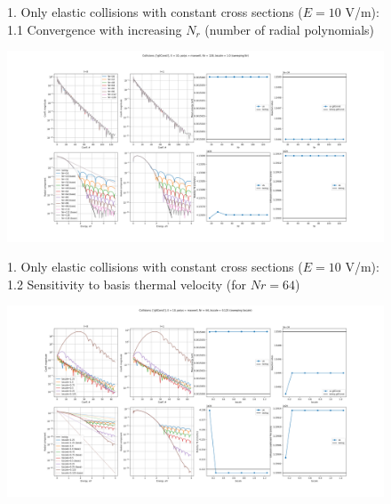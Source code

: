 \documentclass[mathserif, aspectratio=169]{beamer}
\begin{document}
\begin{frame}

\begin{figure}
1. Only elastic collisions with constant cross sections ($E=10$ V/m):
\\ 
1.1 Convergence with increasing $N_r$ (number of radial polynomials)

\includegraphics[width=\textwidth]{maxwell_vs_bolsig_g0Const_E10_poly_maxwell_nrsweep_bscale1.png}
\end{figure}

\end{frame}



\begin{frame}

\begin{figure}
1. Only elastic collisions with constant cross sections ($E=10$ V/m):
\\ 
1.2 Sensitivity to basis thermal velocity (for $Nr = 64$)

\includegraphics[width=\textwidth]{maxwell_vs_bolsig_g0Const_E10_poly_maxwell_nr64_bscalesweep.png}
\end{figure}

\end{frame}
\end{document}
